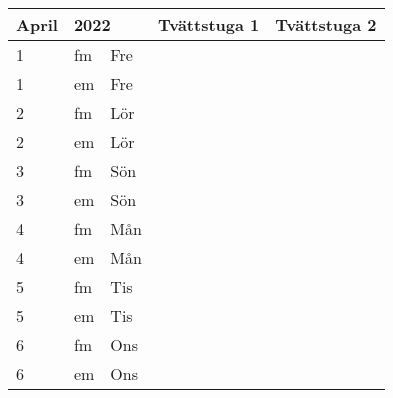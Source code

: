 \documentclass[a4paper]{article}
\begin{document}
\begin{table}[ht!]
\vspace{-10em}%
\normalsize
\begin{tabular}{lllp{7cm}p{7cm}}
\textbf{April}           & \multicolumn{2}{l}{\textbf{2022}}                  & \textbf{Tvättstuga 1} & \textbf{Tvättstuga 2} \\ \hline    

\multicolumn{1}{|l|}{1} & \multicolumn{1}{l|}{fm} & \multicolumn{1}{l|}{Fre} & \multicolumn{1}{l|}{} & \multicolumn{1}{l|}{} \\ \hline
\multicolumn{1}{|l|}{1} & \multicolumn{1}{l|}{em} & \multicolumn{1}{l|}{Fre} & \multicolumn{1}{l|}{} & \multicolumn{1}{l|}{} \\ \hline    

\multicolumn{1}{|l|}{2} & \multicolumn{1}{l|}{fm} & \multicolumn{1}{l|}{Lör} & \multicolumn{1}{l|}{} & \multicolumn{1}{l|}{} \\ \hline
\multicolumn{1}{|l|}{2} & \multicolumn{1}{l|}{em} & \multicolumn{1}{l|}{Lör} & \multicolumn{1}{l|}{} & \multicolumn{1}{l|}{} \\ \hline    

\multicolumn{1}{|l|}{3} & \multicolumn{1}{l|}{fm} & \multicolumn{1}{l|}{Sön} & \multicolumn{1}{l|}{} & \multicolumn{1}{l|}{} \\ \hline
\multicolumn{1}{|l|}{3} & \multicolumn{1}{l|}{em} & \multicolumn{1}{l|}{Sön} & \multicolumn{1}{l|}{} & \multicolumn{1}{l|}{} \\ \hline    

\multicolumn{1}{|l|}{4} & \multicolumn{1}{l|}{fm} & \multicolumn{1}{l|}{Mån} & \multicolumn{1}{l|}{} & \multicolumn{1}{l|}{} \\ \hline
\multicolumn{1}{|l|}{4} & \multicolumn{1}{l|}{em} & \multicolumn{1}{l|}{Mån} & \multicolumn{1}{l|}{} & \multicolumn{1}{l|}{} \\ \hline    

\multicolumn{1}{|l|}{5} & \multicolumn{1}{l|}{fm} & \multicolumn{1}{l|}{Tis} & \multicolumn{1}{l|}{} & \multicolumn{1}{l|}{} \\ \hline
\multicolumn{1}{|l|}{5} & \multicolumn{1}{l|}{em} & \multicolumn{1}{l|}{Tis} & \multicolumn{1}{l|}{} & \multicolumn{1}{l|}{} \\ \hline    

\multicolumn{1}{|l|}{6} & \multicolumn{1}{l|}{fm} & \multicolumn{1}{l|}{Ons} & \multicolumn{1}{l|}{} & \multicolumn{1}{l|}{} \\ \hline
\multicolumn{1}{|l|}{6} & \multicolumn{1}{l|}{em} & \multicolumn{1}{l|}{Ons} & \multicolumn{1}{l|}{} & \multicolumn{1}{l|}{} \\ \hline    


\end{tabular}
\end{table}
\end{document}
